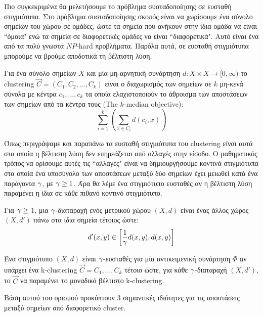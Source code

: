 Πιο συγκεκριμένα θα μελετήσουμε το πρόβλημα συσταδοποίησης σε ευσταθή στιγμιότυπα. Στο πρόβλημα συσταδοποίησης σκοπός είναι να χωρίσουμε ένα σύνολο σημείων του χώρου σε ομάδες, ώστε τα σημεία που ανήκουν στην ίδια ομάδα να είναι ``όμοια" ενώ τα σημεία σε διαφορετικές ομάδες να είναι ``διαφορετικά". Αυτό είναι ένα από τα πολύ γνωστά $NP$-hard προβλήματα. Παρόλα αυτά, σε ευσταθή στιγμιότυπα μπορούμε να βρούμε αποδοτικά τη βέλτιστη λύση. 


 
\begin{definitiongr}
Για ένα σύνολο σημείων $X$ και μία μη-αρνητική συνάρτηση $d: X\times X \rightarrow [ 0, \infty )$ το clustering $\vec{C} = (C_1,C_2,...,C_k)$ είναι ο διαχωρισμός των σημείων σε $k$ μη-κενά σύνολα με κέντρα $c_1,...,c_k$ τα οποία ελαχιστοποιούν  το άθροισμα των αποστάσεων των σημείων από τα κέντρα τους (The $k$-median objective):
    \[ \sum_{i=1}^{k} \left( \sum_{x\in C_i}  d(c_i,x)\right) \]
    
\end{definitiongr}

Όπως περιγράψαμε και παραπάνω τα ευσταθή στιγμιότυπα του clustering είναι αυτά στα οποία η βέλτιστη λύση δεν επηρεάζεται από αλλαγές στην είσοδο. Ο μαθηματικός τρόπος να ορίσουμε αυτές τις ``αλλαγές" είναι να δημιουργήσουμε κοντινά στιγμιότυπα στα οποία ένα υποσύνολο των αποστάσεων μεταξύ δύο σημείων έχει μειωθεί κατά ένα παράγοντα $\g$, με $\gamma\ge1$. Άρα θα λέμε ένα στιγμιότυπο ευσταθές αν η βέλτιστη λύση παραμένει η ίδια σε κάθε πιθανό κοντινό στιγμιότυπο.


\begin{definitiongr}[$\g$-διαταραχή]
Για $\gamma \ge$  1, μια $\g$-διαταραχή ενός μετρικού χώρου $(X, d)$ είναι ένας άλλος χώρος $(X, d')$ πάνω στα ίδια σημεία τέτοιος ώστε:
\[ d'(x,y) \in \left[\frac{1}{\gamma}d(x,y),d(x,y)\right] \]
\end{definitiongr}



\begin{definitiongr}[$\g$-ευστάθεια] 
Ένα στιγμιότυπο $(X, d)$ είναι $\g$-ευσταθές για μία αντικειμενική συνάρτηση $\Phi$ αν υπάρχει ένα  k-clustering $\vec{C}= C_1, . . . , C_k$ τέτοιο ώστε, για κάθε $\g$-διαταραχή $(X, d')$, το  $\vec{C}$ να παραμένει το μοναδικό βέλτιστο  k-clustering.
\end{definitiongr}

Βάση αυτού του ορισμού προκύπτουν 3 σημαντικές ιδιότητες για τις αποστάσεις μεταξύ σημείων από διαφορετικό cluster.

